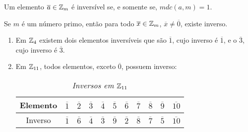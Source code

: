 \begin{proposicao}
    Um elemento $\overline{a} \in \mathbb{Z}_m$ é inversível se, e somente se, $mdc(a,m)=1$.
\end{proposicao}

\begin{corolario}
    Se $m$ é um n\'umero primo, então para todo $\overline{x} \in \mathbb{Z}_m$, $\overline{x} \ne \overline{0}$, existe inverso.
\end{corolario}

\begin{exemplos}
    \begin{enumerate}[label={\arabic*})]
        \item Em $\mathbb{Z}_4$ existem dois elementos inversíveis que são $\overline{1}$, cujo inverso é $\overline{1}$, e o $\overline{3}$, cujo inverso é $\overline{3}$.
        \item Em $\mathbb{Z}_{11}$, todos elementos, exceto $\overline{0}$, possuem inverso:

        \begin{table}[h]
               \centering
               \setlength{\arrayrulewidth}{0,5\arrayrulewidth}
               \caption{\it Inversos em $\mathbb{Z}_{11}$}
           \begin{tabular}{|c|c|c|c|c|c|c|c|c|c|c|}
                \hline
                  Elemento & $\overline{1}$ & $\overline{2}$ & $\overline{3}$ & $\overline{4}$ & $\overline{5}$ & $\overline{6}$ & $\overline{7}$ & $\overline{8}$ & $\overline{9}$ & $\overline{10}$\T \\
                  \hline
                  Inverso & $\overline{1}$ & $\overline{6}$ & $\overline{4}$ & $\overline{3}$ & $\overline{9}$ & $\overline{2}$ & $\overline{8}$ & $\overline{7}$ & $\overline{5}$ & $\overline{10}$\T \\
                  \hline
           \end{tabular}
        \end{table}
    \end{enumerate}
\end{exemplos}




